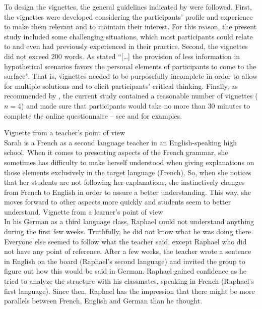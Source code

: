 \documentclass[output=paper]{../langscibook}
\begin{document}
To design the vignettes, the general guidelines indicated by \citet{SimonTierney2011} were followed. First, the vignettes were developed considering the participants’ profile and experience to make them relevant and to maintain their interest. For this reason, the present study included some challenging situations, which most participants could relate to and even had previously experienced in their practice. Second, the vignettes did not exceed 200 words. As \citet[1189]{StravakouLozgka2018} stated “[…] the provision of less information in hypothetical scenarios favors the personal elements of participants to come to the surface”. That is, vignettes needed to be purposefully incomplete in order to allow for multiple solutions and to elicit participants’ critical thinking. Finally, as recommended by \citet{SimonTierney2011}, the current study contained a reasonable number of vignettes ($n=4$) and made sure that participants would take no more than 30 minutes to complete the online questionnaire \citep{Dornyei2010} -- see  and  for examples.

  
\ea Vignette from a teacher's point of view\\\label{ex:paquet:1}
Sarah is a French as a second language teacher in an English-speaking high school. When it comes to presenting aspects of the French grammar, she sometimes has difficulty to make herself understood when giving explanations on those elements exclusively in the target language (French). So, when she notices that her students are not following her explanations, she instinctively changes from French to English in order to assure a better understanding. This way, she moves forward to other aspects more quickly and students seem to better understand.
\ex Vignette from a learner’s point of view\\\label{ex:paquet:2}
In his German as a third language class, Raphael could not understand anything during the first few weeks. Truthfully, he did not know what he was doing there. Everyone else seemed to follow what the teacher said, except Raphael who did not have any point of reference. After a few weeks, the teacher wrote a sentence in English on the board (Raphael's second language) and invited the group to figure out how this would be said in German. Raphael gained confidence as he tried to analyze the structure with his classmates, speaking in French (Raphael's first language). Since then, Raphael has the impression that there might be more parallels between French, English and German than he thought.
\z
\end{document}
